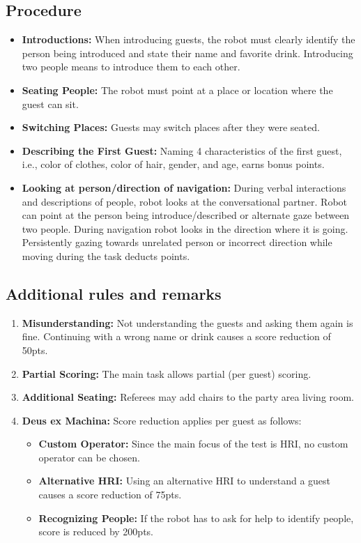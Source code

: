 \subsection*{Procedure}
\begin{itemize}
    \item \textbf{Introductions:} When introducing guests, the robot must clearly identify the person being introduced and state their name and favorite drink. Introducing two people means to introduce them to each other.
	
	\item \textbf{Seating People:} The robot must point at a place or location where the guest can sit.
	
	\item \textbf{Switching Places:} Guests may switch places after they were seated.
	
	\item \textbf{Describing the First Guest:} Naming 4 characteristics of the first guest, i.e., color of clothes, color of hair, gender, and age, earns bonus points.
	\item \textbf{Looking at person/direction of navigation:} During verbal interactions and descriptions of people, robot 
	looks at the conversational partner. Robot can point at the person being introduce/described or alternate gaze between two people. During navigation robot looks in the direction where it is going. Persistently gazing towards unrelated 
	person or incorrect direction while moving during the task deducts points. 
\end{itemize}

\subsection*{Additional rules and remarks}
\begin{enumerate}[nosep]
	\item \textbf{Misunderstanding:} Not understanding the guests and asking them again is fine. Continuing with a wrong name or drink causes a score reduction of 50pts.
		
	\item \textbf{Partial Scoring:} The main task allows partial (per guest) scoring.

	\item \textbf{Additional Seating:} Referees may add chairs to the party area living room.
	
	\item \textbf{Deus ex Machina:} Score reduction applies per guest as follows:
	\begin{itemize}[nosep]
		\item \textbf{Custom Operator:} Since the main focus of the test is HRI, no custom operator can be chosen.
		\item \textbf{Alternative HRI:} Using an alternative HRI to understand a guest causes a score reduction of 75pts.
		\item \textbf{Recognizing People:} If the robot has to ask for help to identify people, score is reduced by 200pts. 
	\end{itemize}
\end{enumerate}



